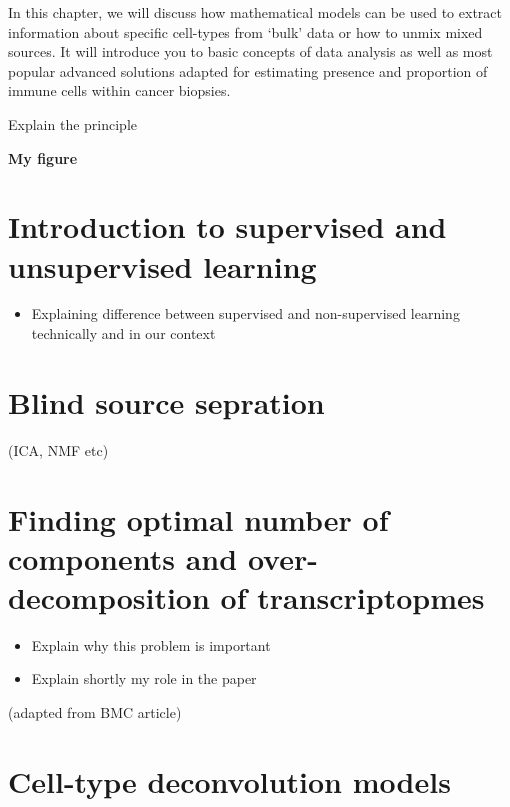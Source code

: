\documentclass[12pt,]{book}
\providecommand{\tightlist}{%
  \setlength{\itemsep}{0pt}\setlength{\parskip}{0pt}}
\theoremstyle{definition}
\theoremstyle{definition}
\theoremstyle{definition}
\theoremstyle{remark}
\begin{document}
In this chapter, we will discuss how mathematical models can be used to
extract information about specific cell-types from `bulk' data or how to
unmix mixed sources. It will introduce you to basic concepts of data
analysis as well as most popular advanced solutions adapted for
estimating presence and proportion of immune cells within cancer
biopsies.

Explain the principle

\textbf{My figure}

\hypertarget{introduction-to-supervised-and-unsupervised-learning}{%
\section{Introduction to supervised and unsupervised
learning}\label{introduction-to-supervised-and-unsupervised-learning}}

\begin{itemize}
\tightlist
\item
  Explaining difference between supervised and non-supervised learning
  technically and in our context
\end{itemize}

\hypertarget{blind-source-sepration}{%
\section{Blind source sepration}\label{blind-source-sepration}}

(ICA, NMF etc)

\hypertarget{finding-optimal-number-of-components-and-over-decomposition-of-transcriptopmes}{%
\section{Finding optimal number of components and over-decomposition of
transcriptopmes}\label{finding-optimal-number-of-components-and-over-decomposition-of-transcriptopmes}}

\begin{itemize}
\tightlist
\item
  Explain why this problem is important
\item
  Explain shortly my role in the paper
\end{itemize}

(adapted from BMC article)


\hypertarget{cell-type-deconvolution-models}{%
\section{Cell-type deconvolution
models}\label{cell-type-deconvolution-models}}
\end{document}
